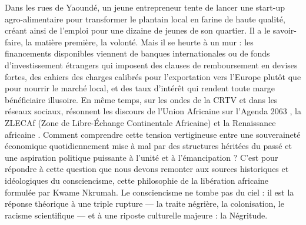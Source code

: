 \documentclass[11pt]{article}
\newcommand{\cle}[1]{{\popxbold\color{popdark}#1}}
\begin{document}
Dans les rues de Yaoundé, un jeune entrepreneur tente de lancer une start-up agro-alimentaire pour transformer le plantain local en farine de haute qualité, créant ainsi de l'emploi pour une dizaine de jeunes de son quartier. Il a le savoir-faire, la matière première, la volonté. Mais il se heurte à un mur : les financements disponibles viennent de banques internationales ou de fonds d'investissement étrangers qui imposent des clauses de remboursement en devises fortes, des cahiers des charges calibrés pour l'exportation vers l'Europe plutôt que pour nourrir le marché local, et des taux d'intérêt qui rendent toute marge bénéficiaire illusoire. En même temps, sur les ondes de la CRTV et dans les réseaux sociaux, résonnent les discours de l'Union Africaine sur l'\guillemotleft Agenda 2063 \guillemotright, la \cle{ZLECAf} (Zone de Libre-Échange Continentale Africaine) et la \guillemotleft Renaissance africaine \guillemotright. Comment comprendre cette tension vertigineuse entre une souveraineté économique quotidiennement mise à mal par des structures héritées du passé et une aspiration politique puissante à l'unité et à l'émancipation ? C'est pour répondre à cette question que nous devons remonter aux sources historiques et idéologiques du \cle{consciencisme}, cette philosophie de la libération africaine formulée par Kwame Nkrumah. Le consciencisme ne tombe pas du ciel : il est la réponse théorique à une triple rupture — la traite négrière, la colonisation, le racisme scientifique — et à une riposte culturelle majeure : la Négritude.
\end{document}
